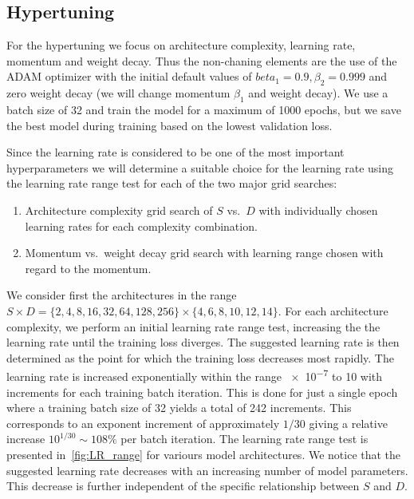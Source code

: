 \subsection{Hypertuning}
For the hypertuning we focus on architecture complexity, learning rate, momentum and weight decay. Thus the non-chaning elements are the use of the ADAM optimizer with the initial default values of $beta_1 = 0.9, \beta_2 = 0.999$ and zero weight decay (we will change momentum $\beta_1$ and weight decay). We use a batch size of 32 and train the model for a maximum of 1000 epochs, but we save the best model during training based on the lowest validation loss. 

Since the learning rate is considered to be one of the most important hyperparameters we will determine a suitable choice for the learning rate using the learning rate range test for each of the two major grid searches:
\begin{enumerate}
  \item Architecture complexity grid search of $S$ vs.\ $D$ with individually chosen learning rates for each complexity combination.
  \item Momentum vs.\ weight decay grid search with learning range chosen with regard to the momentum. 
\end{enumerate}
We consider first the architectures in the range $S \times D =
\{2,4,8,16,32,64,128,256\} \times \{4,6,8,10,12,14\}$. For each architecture
complexity, we perform an initial learning rate range test, increasing the
the learning rate until the training loss diverges. The suggested learning rate is then determined as the point for which the training loss decreases most rapidly. The learning rate is increased exponentially within the range \num{e-7} to 10 with increments for each training batch iteration. This is done for just a single epoch where a training batch size of 32 yields a total of 242 increments. This corresponds to an exponent increment of approximately $1/30$ giving a relative increase $10^{1/30} \sim 108\%$ per batch iteration. The learning rate range test is presented in~\cref{fig:LR_range} for variours model architectures. We notice that the suggested learning rate decreases with an increasing number of model parameters. This decrease is further independent of the specific relationship between $S$ and $D$.

